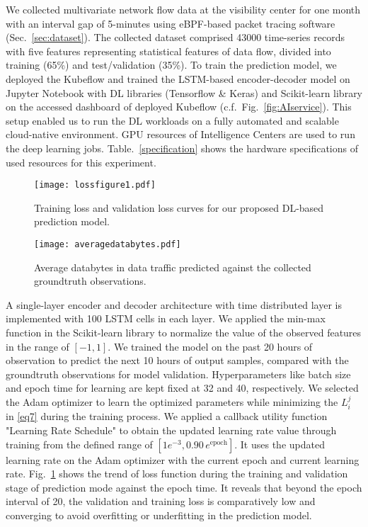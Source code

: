 \documentclass[10pt, conference]{IEEEtran}
\begin{document}
We collected multivariate network flow data at the visibility center for one month with an interval gap of 5-minutes using eBPF-based packet tracing software (Sec.~\ref{sec:dataset}). The collected dataset comprised 43000 time-series records with five features representing statistical features of data flow, divided into training (65\%) and test/validation (35\%). To train the prediction model, we deployed the Kubeflow and trained the LSTM-based encoder-decoder model on Jupyter Notebook with DL libraries (Tensorflow \& Keras) and Scikit-learn library on the accessed dashboard of deployed Kubeflow (c.f.~Fig.~\ref{fig:AIservice}). This setup enabled us to run the DL workloads on a fully automated and scalable cloud-native environment.  GPU resources of Intelligence Centers are used to run the deep learning jobs. Table.~\ref{specification} shows the hardware specifications of used resources for this experiment. 
\begin{figure}
\centering
\texttt{[image: lossfigure1.pdf]}
\vspace{-7pt}
	\caption{Training loss and validation loss curves for our proposed DL-based prediction model.}
	\label{fig:loss}
	\vspace{-10pt}
\end{figure}
\begin{figure}
\centering
\texttt{[image: averagedatabytes.pdf]}
\vspace{-7pt}
	\caption{Average databytes in data traffic predicted against the collected groundtruth observations.}
	\label{fig:average}
	\vspace{-10pt}
\end{figure}
A single-layer encoder and decoder architecture with time distributed layer is implemented with 100 LSTM cells in each layer. We applied the min-max function in the Scikit-learn library to normalize the value of the observed features in the range of $[-1,1]$. We trained the model on the past 20 hours of observation to predict the next 10 hours of output samples, compared with the groundtruth observations for model validation. Hyperparameters like batch size and epoch time for learning are kept fixed at 32 and 40, respectively. We selected the Adam optimizer to learn the optimized parameters while minimizing the $L_i^j$ in \eqref{eq7} during the training process. We applied a callback utility function "Learning Rate Schedule" to obtain the updated learning rate value through training from the defined range of $[1e^{-3},0.90\,e^{\textrm{epoch}}]$. It uses the updated learning rate on the Adam optimizer with the current epoch and current learning rate. Fig.~\ref{fig:loss} shows the trend of loss function during the training and validation stage of prediction mode against the epoch time. It reveals that beyond the epoch interval of 20, the validation and training loss is comparatively low and converging to avoid overfitting or underfitting in the prediction model.  
\end{document}
